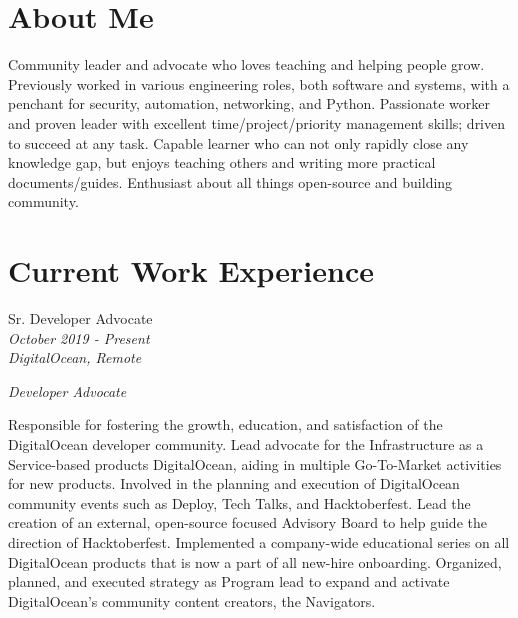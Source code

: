 \documentclass[10pt]{article} %
\begin{document}
\begin{minipage}[t]{0.5\textwidth} %
\vspace{0pt} %
    
\section{About Me}
Community leader and advocate who loves teaching and helping people grow. Previously worked in various engineering roles, both software and systems, with a penchant for security, automation, networking, and Python. Passionate worker and proven leader with excellent time/project/priority management skills; driven to succeed at any task. Capable learner who can not only rapidly close any knowledge gap, but enjoys teaching others and writing more practical documents/guides. Enthusiast about all things open-source and building community.


\section{Current Work Experience} 


{\raggedright\large Sr. Developer Advocate\\
\small \textit{October 2019 - Present}\\
\small \textit{DigitalOcean, Remote} \\
\raggedright\small \textit{Developer Advocate}\\[5pt]}

\normalsize{
    Responsible for fostering the growth, education, and satisfaction of the DigitalOcean developer community. Lead advocate for the Infrastructure as a Service-based products DigitalOcean, aiding in multiple Go-To-Market activities for new products. Involved in the planning and execution of DigitalOcean community events such as Deploy, Tech Talks, and Hacktoberfest. Lead the creation of an external, open-source focused Advisory Board to help guide the direction of Hacktoberfest. Implemented a company-wide educational series on all DigitalOcean products that is now a part of all new-hire onboarding. Organized, planned, and executed strategy as Program lead to expand and activate DigitalOcean's community content creators, the Navigators. \\
    
}
\end{minipage}
\end{document}
